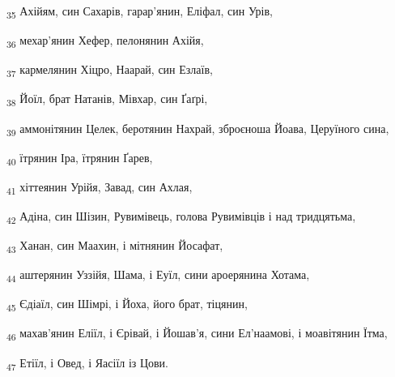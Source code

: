 \begin{tcolorbox}
\textsubscript{35} Ахійям, син Сахарів, гарар'янин, Еліфал, син Урів,
\end{tcolorbox}
\begin{tcolorbox}
\textsubscript{36} мехар'янин Хефер, пелонянин Ахійя,
\end{tcolorbox}
\begin{tcolorbox}
\textsubscript{37} кармелянин Хіцро, Наарай, син Езлаїв,
\end{tcolorbox}
\begin{tcolorbox}
\textsubscript{38} Йоїл, брат Натанів, Мівхар, син Ґаґрі,
\end{tcolorbox}
\begin{tcolorbox}
\textsubscript{39} аммонітянин Целек, беротянин Нахрай, зброєноша Йоава, Церуїного сина,
\end{tcolorbox}
\begin{tcolorbox}
\textsubscript{40} їтрянин Іра, їтрянин Ґарев,
\end{tcolorbox}
\begin{tcolorbox}
\textsubscript{41} хіттеянин Урійя, Завад, син Ахлая,
\end{tcolorbox}
\begin{tcolorbox}
\textsubscript{42} Адіна, син Шізин, Рувимівець, голова Рувимівців і над тридцятьма,
\end{tcolorbox}
\begin{tcolorbox}
\textsubscript{43} Ханан, син Маахин, і мітнянин Йосафат,
\end{tcolorbox}
\begin{tcolorbox}
\textsubscript{44} аштерянин Уззійя, Шама, і Еуїл, сини ароерянина Хотама,
\end{tcolorbox}
\begin{tcolorbox}
\textsubscript{45} Єдіаїл, син Шімрі, і Йоха, його брат, тіцянин,
\end{tcolorbox}
\begin{tcolorbox}
\textsubscript{46} махав'янин Еліїл, і Єрівай, і Йошав'я, сини Ел'наамові, і моавітянин Їтма,
\end{tcolorbox}
\begin{tcolorbox}
\textsubscript{47} Етіїл, і Овед, і Яасіїл із Цови.
\end{tcolorbox}
